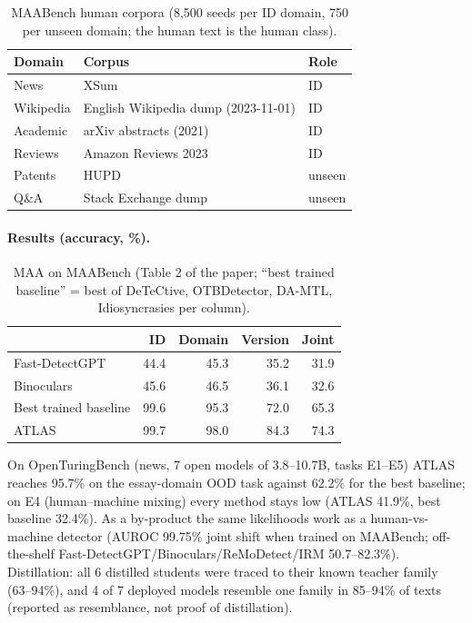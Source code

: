 \documentclass[10pt,a4paper,twocolumn]{article}
\begin{document}
\begin{table}[H]\centering\footnotesize
\begin{tabular}{@{}lll@{}}
\hline
Domain & Corpus & Role \\ \hline
News & XSum & ID \\
Wikipedia & English Wikipedia dump (2023-11-01) & ID \\
Academic & arXiv abstracts (2021) & ID \\
Reviews & Amazon Reviews 2023 & ID \\
Patents & HUPD & unseen \\
Q\&A & Stack Exchange dump & unseen \\ \hline
\end{tabular}
\caption{MAABench human corpora (8,500 seeds per ID domain, 750 per unseen domain; the human text is the human class).}
\end{table}

\paragraph{Results (accuracy, \%).}
\begin{table}[H]\centering\footnotesize
\begin{tabular}{@{}lrrrr@{}}
\hline
 & ID & Domain & Version & Joint \\ \hline
Fast-DetectGPT & 44.4 & 45.3 & 35.2 & 31.9 \\
Binoculars & 45.6 & 46.5 & 36.1 & 32.6 \\
Best trained baseline & 99.6 & 95.3 & 72.0 & 65.3 \\
ATLAS & 99.7 & 98.0 & 84.3 & 74.3 \\ \hline
\end{tabular}
\caption{MAA on MAABench (Table 2 of the paper; ``best trained baseline'' = best of DeTeCtive, OTBDetector, DA-MTL, Idiosyncrasies per column).}
\end{table}
On OpenTuringBench (news, 7 open models of 3.8--10.7B, tasks E1--E5) ATLAS reaches 95.7\% on the essay-domain OOD task against 62.2\% for the best baseline; on E4 (human--machine mixing) every method stays low (ATLAS 41.9\%, best baseline 32.4\%). As a by-product the same likelihoods work as a human-vs-machine detector (AUROC 99.75\% joint shift when trained on MAABench; off-the-shelf Fast-DetectGPT/Binoculars/ReMoDetect/IRM 50.7--82.3\%). Distillation: all 6 distilled students were traced to their known teacher family (63--94\%), and 4 of 7 deployed models resemble one family in 85--94\% of texts (reported as resemblance, not proof of distillation).
\end{document}

